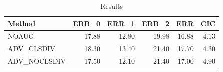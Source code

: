 \begin{table}
\caption{Results}
\label{tab:Results}
\begin{tabular}{lrrrrr}
\toprule
Method & ERR\_0 & ERR\_1 & ERR\_2 & ERR & CIC \\
\midrule
NOAUG & 17.88 & 12.80 & 19.98 & 16.88 & 4.13 \\
ADV\_CLSDIV & 18.30 & 13.40 & 21.40 & 17.70 & 4.30 \\
ADV\_NOCLSDIV & 17.50 & 12.10 & 21.40 & 17.00 & 4.90 \\
\bottomrule
\end{tabular}
\end{table}

